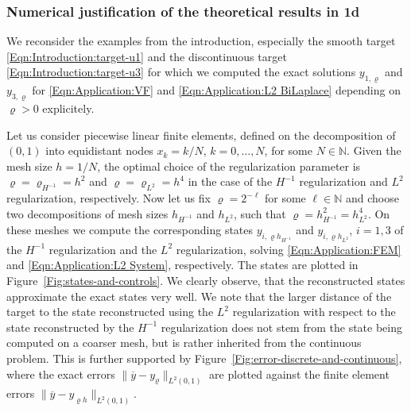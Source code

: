 \documentclass{article}
\newcommand{\norm}[1]{\|#1\|}
\numberwithin{equation}{section}
\begin{document}
\subsubsection{Numerical justification of the theoretical results in 1d}
\label{Subsubsection:NumericalResults:1d}
We reconsider the examples from the introduction, especially the smooth
target \eqref{Eqn:Introduction:target-u1} and the discontinuous target
\eqref{Eqn:Introduction:target-u3} for which we computed the exact solutions
$y_{1,\varrho}$ and $y_{3,\varrho}$ for \eqref{Eqn:Application:VF} and
\eqref{Eqn:Application:L2 BiLaplace} depending on $\varrho>0$ explicitely.

Let us consider piecewise linear finite elements, defined on the decomposition
of $(0,1)$ into equidistant nodes $x_k = k/N$, $k=0,\ldots,N$, for some
$N\in\mathbb{N}$. Given the mesh size $h=1/N$, the optimal choice of the
regularization parameter is $\varrho = \varrho_{H^{-1}} = h^2$ and
$\varrho = \varrho_{L^2}=h^4$ in the case of the $H^{-1}$ regularization and
$L^2$ regularization, respectively. Now let us fix $\varrho=2^{-\ell}$ for
some $\ell\in\mathbb{N}$ and choose two decompositions of mesh sizes
$h_{H^{-1}}$ and $h_{L^2}$, such that $\varrho = h_{H^{-1}}^2 = h_{L^2}^4$.
On these meshes we compute the corresponding states $y_{i,\varrho h_{H^{-1}}}$
and $y_{i, \varrho h_{L^2}}$, $i=1,3$ of the $H^{-1}$ regularization and the
$L^2$ regularization, solving \eqref{Eqn:Application:FEM} and
\eqref{Eqn:Application:L2 System}, respectively. The states are plotted in
Figure~\ref{Fig:states-and-controls}. We clearly observe, that the
reconstructed states approximate the exact states very well. We note that
the larger distance of the target to the state reconstructed using the $L^2$
regularization with respect to the state reconstructed by the $H^{-1}$
regularization does not stem from the state being computed on a coarser mesh,
but is rather inherited from the continuous problem. This is further supported
by Figure~\ref{Fig:error-discrete-and-continuous}, where the exact errors
$\norm{\overline{y}-y_\varrho}_{L^2(0,1)}$ are plotted against the finite
element errors $\norm{\overline{y}-y_{\varrho h}}_{L^2(0,1)}$.  
\end{document}
